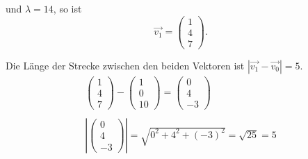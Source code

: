 und $\displaystyle \lambda =14$, so ist
\begin{equation*}
	\overrightarrow{v_{1}} =\begin{pmatrix}
		1\\
		4\\
		7
	\end{pmatrix}\text{.}
\end{equation*}


Die Länge der Strecke zwischen den beiden Vektoren ist $\displaystyle \left| \overrightarrow{v_{1}} -\overrightarrow{v_{0}}\right| =5$.
\begin{gather*}
	\begin{pmatrix}
		1\\
		4\\
		7
	\end{pmatrix} -\begin{pmatrix}
		1\\
		0\\
		10
	\end{pmatrix} =\begin{pmatrix}
		0\\
		4\\
		-3
	\end{pmatrix}\\
	\\
	\left| \begin{pmatrix}
		0\\
		4\\
		-3
	\end{pmatrix}\right| =\sqrt{0^{2} +4^{2} +( -3)^{2}} =\sqrt{25} =5
\end{gather*}
